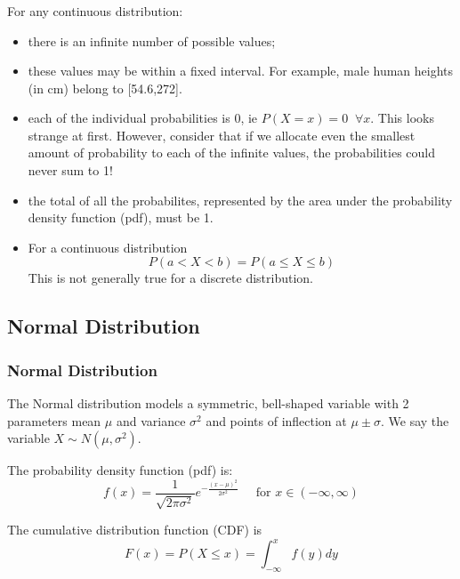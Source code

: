 \documentclass[t,xcolor=pdftex,dvipsnames,table]{beamer}\usepackage[]{graphicx}\usepackage[]{color}
\begin{document}
\begin{frame}\frametitle{}

For any continuous distribution:

\begin{itemize}
\item
there is an infinite number of possible values;
\item
these values may be within a fixed interval. For example, male human heights (in cm) belong to [54.6,272].
\hyperlink{https://en.wikipedia.org/wiki/Human_height}{}
\item
each of the individual probabilities is 0, ie $P(X=x)=0 \;\; \forall x$. This looks strange at first. However, consider that if we allocate even the smallest amount of probability to each of the infinite values, the probabilities could never sum to 1!
\item
the total of all the probabilites, represented by the area under the probability density function (pdf), must be  1.
\item For a continuous distribution
\[ P(a < X < b) = P(a \leq X \leq b) \] 
This is not generally true for a discrete distribution.
\end{itemize}
\end{frame}


\subsection[Normal Distribution]{Normal Distribution}

\begin{frame}[fragile,label=Normalpdf]\frametitle{Normal Distribution}

\begin{definition}
The \alert{Normal distribution} models a symmetric, bell-shaped variable with 2 parameters mean $\mu$ and variance $\sigma^2$ and points of inflection at $\mu \pm \sigma$. We say the variable $X \sim N(\mu, \sigma^2)$. 

\vspace{.5cm}
The probability density function (pdf) is:
\[ f(x)  =  \frac{1}{  \sqrt{2 \pi \sigma^2}}  e^{   -\frac{ (x-\mu)^2 }{2 \sigma^2  } }
\;\;\;\;\; \mbox{for }  x \in (- \infty, \infty) \]

The cumulative distribution function (CDF) is
\[ F(x) = P(X \leq x) = \int_{-\infty}^{x} f(y) dy \]
\end{definition}

\end{frame}
\end{document}

